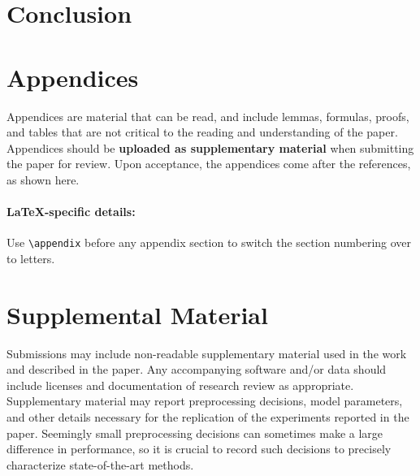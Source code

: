 \documentclass[11pt,a4paper]{article}
\newcommand{\R}{\mathbb{R}}
\begin{document}


\section{Conclusion}




\appendix

\section{Appendices}
\label{sec:appendix}
Appendices are material that can be read, and include lemmas, formulas, proofs, and tables that are not critical to the reading and understanding of the paper. 
Appendices should be \textbf{uploaded as supplementary material} when submitting the paper for review.
Upon acceptance, the appendices come after the references, as shown here.

\paragraph{\LaTeX-specific details:}
Use {\small\verb|\appendix|} before any appendix section to switch the section numbering over to letters.


\section{Supplemental Material}
\label{sec:supplemental}
Submissions may include non-readable supplementary material used in the work and described in the paper.
Any accompanying software and/or data should include licenses and documentation of research review as appropriate.
Supplementary material may report preprocessing decisions, model parameters, and other details necessary for the replication of the experiments reported in the paper.
Seemingly small preprocessing decisions can sometimes make a large difference in performance, so it is crucial to record such decisions to precisely characterize state-of-the-art methods. 
\end{document}
